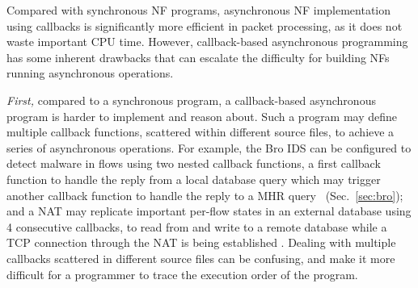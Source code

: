 
Compared with synchronous NF programs, asynchronous NF implementation using callbacks is significantly more efficient in packet processing, as it does not waste important CPU time. However, callback-based asynchronous programming has some inherent drawbacks that can escalate the difficulty for building NFs running asynchronous operations.

\textit{First,} compared to a synchronous program, a callback-based asynchronous program is harder to implement and reason about. %
Such a program may define multiple callback functions, scattered within different source files, to achieve a series of asynchronous operations. For example, the Bro IDS can be configured to detect malware in flows using two nested callback functions, a first callback function to handle the reply from a local database query which may trigger another callback function to handle the reply to a MHR query~ (Sec.~\ref{sec:bro}); and a NAT may replicate important per-flow states in an external database using 4 consecutive callbacks, to read from and write to a remote database while a TCP connection through the NAT is being established \cite{201545}. Dealing with multiple callbacks scattered in different source files can be confusing, and make it more difficult for a programmer to trace the execution order of the program. %


